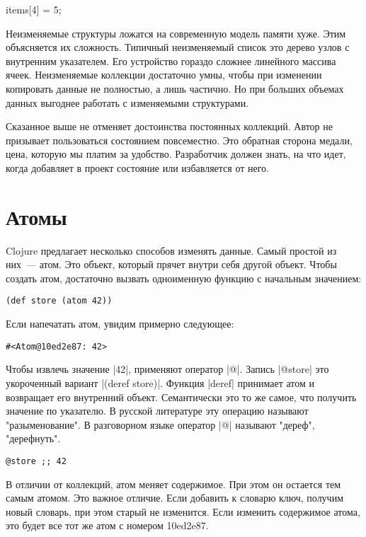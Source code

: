 items[4] = 5;

Неизменяемые структуры ложатся на современную модель памяти хуже. Этим
объясняется их сложность. Типичный неизменяемый список это дерево узлов с
внутренним указателем. Его устройство гораздо сложнее линейного массива
ячеек. Неизменяемые коллекции достаточно умны, чтобы при изменении копировать
данные не полностью, а лишь частично. Но при больших объемах данных выгоднее
работать с изменяемыми структурами.

Сказанное выше не отменяет достоинства постоянных коллекций. Автор не призывает
пользоваться состоянием повсеместно. Это обратная сторона медали, цена, которую
мы платим за удобство. Разработчик должен знать, на что идет, когда добавляет в
проект состояние или избавляется от него.

\section{Атомы}

Clojure предлагает несколько способов изменять данные. Самый простой из них~---
атом. Это объект, который прячет внутри себя другой объект. Чтобы создать атом,
достаточно вызвать одноименную функцию с начальным значением:

\begin{verbatim}
(def store (atom 42))
\end{verbatim}

Если напечатать атом, увидим примерно следующее:

\begin{verbatim}
#<Atom@10ed2e87: 42>
\end{verbatim}

Чтобы извлечь значение \spverb|42|, применяют оператор \spverb|@|. Запись \spverb|@store| это
укороченный вариант \spverb|(deref store)|. Функция \spverb|deref| принимает атом и возвращает
его внутренний объект. Семантически это то же самое, что получить значение по
указателю. В русской литературе эту операцию называют "разыменование". В
разговорном языке оператор \spverb|@| называют "дереф", "дерефнуть".

\begin{verbatim}
@store ;; 42
\end{verbatim}

В отличии от коллекций, атом меняет содержимое. При этом он остается тем самым
атомом. Это важное отличие. Если добавить к словарю ключ, получим новый словарь,
при этом старый не изменится. Если изменить содержимое атома, это будет все тот
же атом с номером 10ed2e87.

